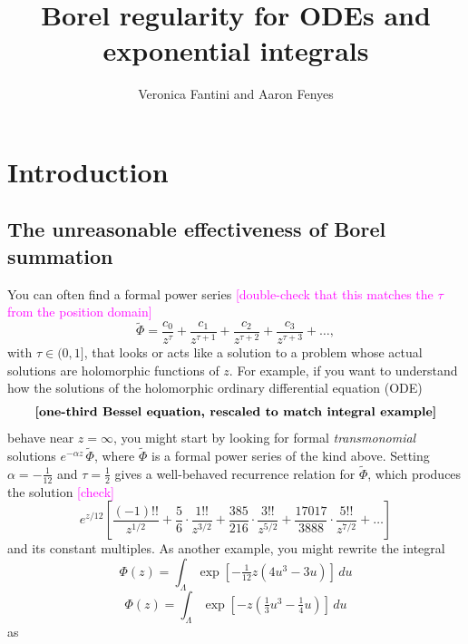 \documentclass{article}
\title{Borel regularity for ODEs and exponential integrals}
\author{Veronica Fantini and Aaron Fenyes}
\newcommand{\series}[1]{\tilde{#1}}
\begin{document}
\maketitle

\section{Introduction}
\subsection{The unreasonable effectiveness of Borel summation}\label{intro:summation}
You can often find a formal power series \textcolor{magenta}{[double-check that this matches the $\tau$ from the position domain]}
\[ \series{\Phi} = \frac{c_0}{z^\tau} + \frac{c_1}{z^{\tau+1}} + \frac{c_2}{z^{\tau+2}} + \frac{c_3}{z^{\tau+3}} + \ldots, \]
with $\tau \in (0, 1]$, that looks or acts like a solution to a problem whose actual solutions are holomorphic functions of $z$. For example, if you want to understand how the solutions of the holomorphic ordinary differential equation (ODE)
\begin{equation}
\text{\bf [one-third Bessel equation, rescaled to match integral example]} \label{eqn:bessel-rescaled}
\end{equation}
behave near $z = \infty$, you might start by looking for formal {\em transmonomial} solutions $e^{-\alpha z}\,\series{\Phi}$, where $\series{\Phi}$ is a formal power series of the kind above. Setting $\alpha = -\tfrac{1}{12}$ and $\tau = \tfrac{1}{2}$ gives a well-behaved recurrence relation for $\series{\Phi}$, which produces the solution \textcolor{magenta}{[check]}
\begin{equation}
e^{z/12} \left[ \frac{(-1)!!}{z^{1/2}} + \frac{5}{6} \cdot \frac{1!!}{z^{3/2}} + \frac{385}{216} \cdot \frac{3!!}{z^{5/2}} + \frac{17017}{3888} \cdot \frac{5!!}{z^{7/2}} + \ldots \right] \label{series:bessel-ex}
\end{equation}
and its constant multiples. As another example, you might rewrite the integral
\color{DodgerBlue}
\[ \Phi(z) = \int_{\Lambda} \exp\left[-\tfrac{1}{12} z \left(4u^3 - 3u\right)\right]\,du \]
\color{black}
\[ \Phi(z) = \int_{\Lambda} \exp\left[-z \left(\tfrac{1}{3} u^3 - \tfrac{1}{4} u\right)\right]\,du \]
as
\end{document}
